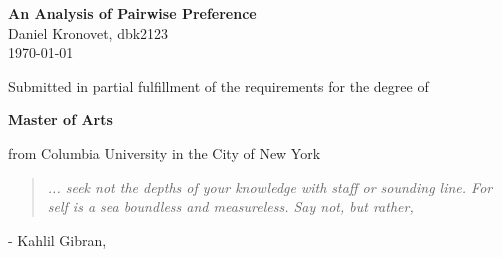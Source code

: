 \begin{center}
  \Large \textbf{An Analysis of Pairwise Preference} \\
  \vspace{0.1in}
  \normalsize Daniel Kronovet, dbk2123\\
  \today
\end{center}

\bigskip

\begin{center}  
Submitted in partial fulfillment of the requirements for the degree of

\textbf{Master of Arts}

from Columbia University in the City of New York
\end{center}

\bigskip
  
\begin{center}  
\begin{quotation}
\textit{
	... seek not the depths of your knowledge with staff or sounding line.
	For self is a sea boundless and measureless.
	Say not,  but rather, 
	}
\end{quotation}
- Kahlil Gibran, \textit{} 
\end{center}
